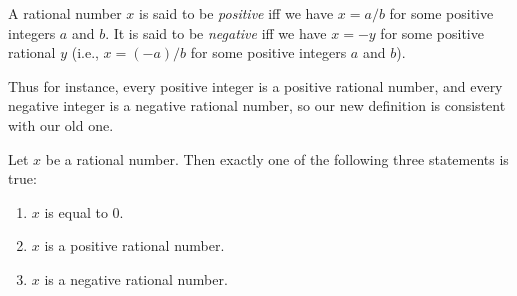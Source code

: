 \begin{defn}\label{i:4.2.6}
  A rational number \(x\) is said to be \emph{positive} iff we have \(x = a / b\) for some positive integers \(a\) and \(b\).
  It is said to be \emph{negative} iff we have \(x = -y\) for some positive rational \(y\)
  (i.e., \(x = (-a) / b\) for some positive integers \(a\) and \(b\)).

  Thus for instance, every positive integer is a positive rational number, and every negative integer is a negative rational number, so our new definition is consistent with our old one.
\end{defn}

\begin{lem}\label{i:4.2.7}
  Let \(x\) be a rational number.
  Then exactly one of the following three statements is true:
  \begin{enumerate}
    \item \(x\) is equal to \(0\).
    \item \(x\) is a positive rational number.
    \item \(x\) is a negative rational number.
  \end{enumerate}
\end{lem}

